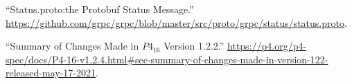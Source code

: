 \documentclass[11pt]{article}
\begin{document}
{{\begin{thebibliography}{45}
\mdbibitemlabel{{}[33]}\textquotedblleft{}Status.proto:the Protobuf Status Message.\textquotedblright{} \href{https://github.com/grpc/grpc/blob/master/src/proto/grpc/status/status.proto}{{\ttfamily https://\hspace{0pt}github.\hspace{0pt}com/\hspace{0pt}grpc/\hspace{0pt}grpc/\hspace{0pt}blob/\hspace{0pt}master/\hspace{0pt}src/\hspace{0pt}proto/\hspace{0pt}grpc/\hspace{0pt}status/\hspace{0pt}status.\hspace{0pt}proto}}.\label{protostatus}%

\mdbibitemlabel{{}[34]}\textquotedblleft{}Summary of Changes Made in $P4_{16}$ Version 1.2.2.\textquotedblright{} \href{https://p4.org/p4-spec/docs/P4-16-v1.2.4.html\%23sec-summary-of-changes-made-in-version-122-released-may-17-2021}{{\ttfamily https://\hspace{0pt}p4.\hspace{0pt}org/\hspace{0pt}p4-\hspace{0pt}spec/\hspace{0pt}docs/\hspace{0pt}P4-\hspace{0pt}16-\hspace{0pt}v1.\hspace{0pt}2.\hspace{0pt}4.\hspace{0pt}html\#\hspace{0pt}sec-\hspace{0pt}summary-\hspace{0pt}of-\hspace{0pt}changes-\hspace{0pt}made-\hspace{0pt}in-\hspace{0pt}version-\hspace{0pt}122-\hspace{0pt}released-\hspace{0pt}may-\hspace{0pt}17-\hspace{0pt}2021}}.\label{p4revisions122}%


\end{thebibliography}}}
\end{document}
